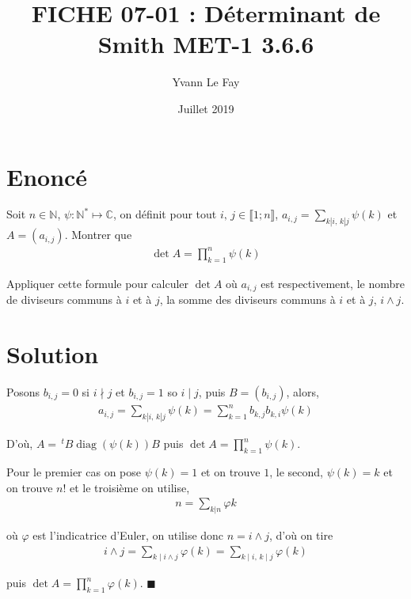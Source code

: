 \documentclass{article}
\newcommand*{\QED}{\hfill\ensuremath{\blacksquare}}%
\DeclareMathOperator{\diag}{diag}
\begin{document}
\title{FICHE 07-01 : Déterminant de Smith MET-1 3.6.6}
\author{Yvann Le Fay}
\date{Juillet 2019}
\maketitle
\section*{Enoncé}
Soit $n\in\mathbb{N}$, $\psi : \mathbb{N}^* \mapsto \mathbb{C}$, on définit pour tout $i,\,j\in\llbracket 1;n\rrbracket$, $a_{i,j}=\sum_{k|i,\,k|j}\psi(k)$ et $A=(a_{i,j})$. Montrer que
\begin{align*}
\det A =\prod_{k=1}^n \psi(k)
\end{align*}

Appliquer cette formule pour calculer $\det A$ où $a_{i,j}$ est respectivement, le nombre de diviseurs communs à $i$ et à $j$, la somme des diviseurs communs à $i$ et à $j$, $i\wedge j$.
\section*{Solution}
Posons $b_{i,j} = 0$ si $i\nmid j$ et $b_{i,j}=1$ so $i\mid j$, puis $B=(b_{i,j})$, alors,
\begin{align*}
a_{i,j}=\sum_{k|i,\,k|j}{\psi(k)}=\sum_{k=1}^n b_{k,j}b_{k,i}\psi(k)
\end{align*}

D'où, $A=\,^{t}B\diag(\psi(k))B$ puis $\det A = \prod_{k=1}^{n}\psi(k)$.

Pour le premier cas on pose $\psi(k)=1$ et on trouve $1$, le second, $\psi(k)=k$ et on trouve $n!$ et le troisième on utilise,
\begin{align*}
n = \sum_{k|n}\varphi{k}
\end{align*}

où $\varphi$ est l'indicatrice d'Euler, on utilise donc $n=i \wedge j$, d'où on tire
\begin{align*}
i\wedge j =\sum_{k\mid i\wedge j}\varphi(k) = \sum_{k\mid i,\,k\mid j}\varphi(k)
\end{align*}

puis $\det A = \prod_{k=1}^n \varphi(k)$.
\QED
\end{document}

